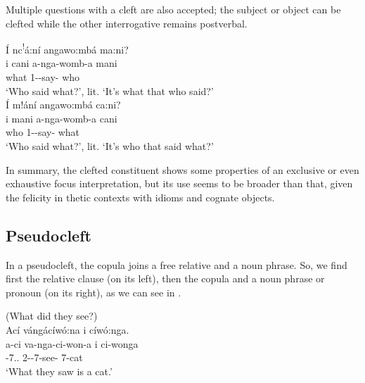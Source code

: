 \documentclass[output=paper]{langscibook}
\begin{document}
\z
\z

Multiple questions with a cleft are also accepted; the subject or object can be clefted while the other interrogative remains postverbal.\pagebreak

\ea
\ea
Í nc\textsuperscript{!}á:ní angawo:mbá ma:ni?\\
\gll
i  cani  a-nga-womb-a  mani\\
\COP{}  what  1\SM{}-\REL{}-say-\FV{}  who\\
\glt
‘Who said what?’, lit. ‘It’s what that who said?’\\


\ex
Í m!ání angawo:mbá ca:ni?\\
\gll
i  mani  a-nga-womb-a  cani\\
\COP{}  who  1\SM{}-\REL{}-say-\FV{}  what\\
\glt
‘Who said what?’, lit. ‘It’s who that said what?’\\

\z
\z

In summary, the clefted constituent shows some properties of an exclusive or even exhaustive focus interpretation, but its use seems to be broader than that, given the felicity in thetic contexts with idioms and cognate objects.

\subsection{Pseudocleft}

In a pseudocleft, the copula joins a free relative and a noun phrase. So, we find first the relative clause (on its left), then the copula and a noun phrase or pronoun (on its right), as we can see in .

\ea
\label{bkm:Ref120695311}
(What did they see?)\\
Ací vángácíwó:na i cíwó:nga.\\
\gll
a-ci  va-nga-ci-won-a  i  ci-wonga\\
\AUG{}-7.\DEM.\PROX{}  2\SM{}-\REL{}-7\OM{}-see-\FV{}  \COP{}  7-cat\\
\glt
‘What they saw is a cat.’\\

\z
\end{document}
